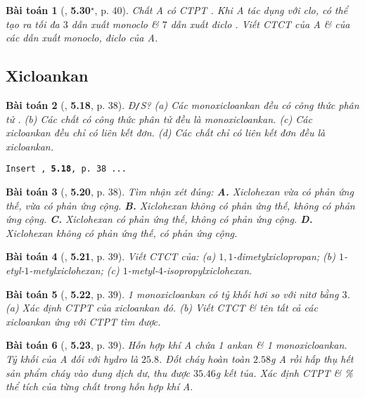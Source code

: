 \documentclass{article}
\numberwithin{equation}{section}
\newtheorem{baitoan}{Bài toán}[section]
\begin{document}
\begin{baitoan}[\cite{SBT_Hoa_Hoc_11_co_ban}, \textbf{5.30}${}^\star$, p. 40]
	Chất A có CTPT \emph{}. Khi A tác dụng với clo, có thể tạo ra tối đa $3$ dẫn xuất monoclo \emph{} \& $7$ dẫn xuất điclo \emph{}. Viết CTCT của A \& của các dẫn xuất monoclo, điclo của A.
\end{baitoan}


\subsection{Xicloankan}

\begin{baitoan}[\cite{SBT_Hoa_Hoc_11_co_ban}, \textbf{5.18}, p. 38]
	\emph{Đ\texttt{/}S?} (a) Các monoxicloankan đều có công thức phân tử \emph{}. (b) Các chất có công thức phân tử \emph{} đều là monoxicloankan. (c) Các xicloankan đều chỉ có liên kết đơn. (d) Các chất chỉ có liên kết đơn đều là xicloankan.
\end{baitoan}
\texttt{Insert \cite{SBT_Hoa_Hoc_11_co_ban}, \textbf{5.18}, p. 38 ...}

\begin{baitoan}[\cite{SBT_Hoa_Hoc_11_co_ban}, \textbf{5.20}, p. 38]
	Tìm nhận xét đúng: {\bf A.} Xiclohexan vừa có phản ứng thế, vừa có phản ứng cộng. {\bf B.} Xiclohexan không có phản ứng thế, không có phản ứng cộng. {\bf C.} Xiclohexan có phản ứng thế, không có phản ứng cộng. {\bf D.} Xiclohexan không có phản ứng thế, có phản ứng cộng.
\end{baitoan}

\begin{baitoan}[\cite{SBT_Hoa_Hoc_11_co_ban}, \textbf{5.21}, p. 39]
	Viết CTCT của: (a) $1,1$-đimetylxiclopropan; (b) $1$-etyl-$1$-metylxiclohexan; (c) $1$-metyl-$4$-isopropylxiclohexan.
\end{baitoan}

\begin{baitoan}[\cite{SBT_Hoa_Hoc_11_co_ban}, \textbf{5.22}, p. 39]
	1 monoxicloankan có tỷ khối hơi so với nitơ bằng $3$. (a) Xác định CTPT của xicloankan đó. (b) Viết CTCT \& tên tất cả các xicloankan ứng với CTPT tìm được.
\end{baitoan}

\begin{baitoan}[\cite{SBT_Hoa_Hoc_11_co_ban}, \textbf{5.23}, p. 39]
	Hỗn hợp khí A chứa 1 ankan \& 1 monoxicloankan. Tỷ khối của A đối với hydro là $25.8$. Đốt cháy hoàn toàn $2.58$\emph{g} A rồi hấp thụ hết sản phẩm cháy vào dung dịch \emph{} dư, thu được $35.46$\emph{g} kết tủa. Xác định CTPT \& \% thể tích của từng chất trong hỗn hợp khí A.
\end{baitoan}
\end{document}
